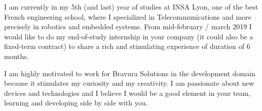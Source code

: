 \documentclass[11pt, a4paper]{awesome-cv}
\begin{document}
\makecvheader[R]


\makelettertitle

\begin{cvletter}

I am currently in my 5th (and last) year of studies at INSA Lyon, one of the best French engineering school, where I specialized in Telecommunications and more precisely in robotics and embedded systems. From mid-february / march 2019 I would like to do my end-of-study internship in your company (it could also be a fixed-term contract) to share a rich and stimulating experience of duration of 6 months. 

\vspace{1mm} %



I am highly motivated to work for Bravura Solutions in the development domain because it stimulates my curiosity and my creativity. I am passionate about new devices and technologies and I believe I would be a good element in your team, learning and developing side by side with you. 


\end{cvletter}
\end{document}
